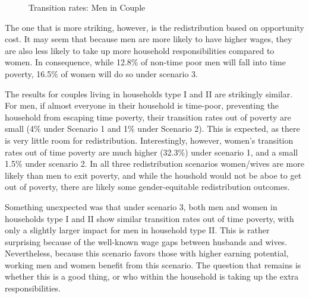 \documentclass[
  11pt,
]{article}
\begin{document}
\begin{figure}[H]


\caption{\label{fig-transition1}Transition rates: Men in Couple}

\end{figure}%

The one that is more striking, however, is the redistribution based on
opportunity cost. It may seem that because men are more likely to have
higher wages, they are also less likely to take up more household
responsibilities compared to women. In consequence, while 12.8\% of
non-time poor men will fall into time poverty, 16.5\% of women will do
so under scenario 3.

The results for couples living in households type I and II are
strikingly similar. For men, if almost everyone in their household is
time-poor, preventing the household from escaping time poverty, their
transition rates out of poverty are small (4\% under Scenario 1 and 1\%
under Scenario 2). This is expected, as there is very little room for
redistribution. Interestingly, however, women's transition rates out of
time poverty are much higher (32.3\%) under scenario 1, and a small
1.5\% under scenario 2. In all three redistribution scenarios
women/wives are more likely than men to exit poverty, and while the
houshold would not be aboe to get out of poverty, there are likely some
gender-equitable redistribution outcomes.

Something unexpected was that under scenario 3, both men and women in
households type I and II show similar transition rates out of time
poverty, with only a slightly larger impact for men in household type
II. This is rather surprising because of the well-known wage gaps
between husbands and wives. Nevertheless, because this scenario favors
those with higher earning potential, working men and women benefit from
this scenario. The question that remains is whether this is a good
thing, or who within the household is taking up the extra
responsibilities.
\end{document}
